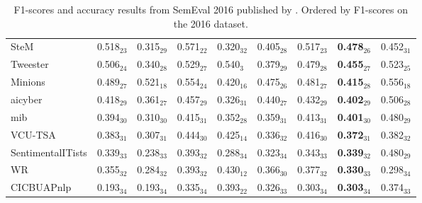 \begin{table}[H]
{\begin{tabular}{|l|ll|lll|l|l|l|}
SteM & 0.518$_{23}$ & 0.315$_{29}$ & 0.571$_{22}$ & 0.320$_{32}$ & 0.405$_{28}$ & 0.517$_{23}$ & \bf 0.478$_{26}$ & 0.452$_{31}$ \\
Tweester & 0.506$_{24}$ & 0.340$_{28}$ & 0.529$_{27}$ & 0.540$_{3}$ & 0.379$_{29}$ & 0.479$_{28}$ & \bf 0.455$_{27}$ & 0.523$_{25}$ \\
Minions & 0.489$_{27}$ & 0.521$_{18}$ & 0.554$_{24}$ & 0.420$_{16}$ & 0.475$_{26}$ & 0.481$_{27}$ & \bf 0.415$_{28}$ & 0.556$_{18}$ \\
aicyber & 0.418$_{29}$ & 0.361$_{27}$ & 0.457$_{29}$ & 0.326$_{31}$ & 0.440$_{27}$ & 0.432$_{29}$ & \bf 0.402$_{29}$ & 0.506$_{28}$ \\
mib & 0.394$_{30}$ & 0.310$_{30}$ & 0.415$_{31}$ & 0.352$_{28}$ & 0.359$_{31}$ & 0.413$_{31}$ & \bf 0.401$_{30}$ & 0.480$_{29}$ \\
VCU-TSA & 0.383$_{31}$ & 0.307$_{31}$ & 0.444$_{30}$ & 0.425$_{14}$ & 0.336$_{32}$ & 0.416$_{30}$ & \bf 0.372$_{31}$ & 0.382$_{32}$ \\
SentimentalITists & 0.339$_{33}$ & 0.238$_{33}$ & 0.393$_{32}$ & 0.288$_{34}$ & 0.323$_{34}$ & 0.343$_{33}$ & \bf 0.339$_{32}$ & 0.480$_{29}$ \\
WR & 0.355$_{32}$ & 0.284$_{32}$ & 0.393$_{32}$ & 0.430$_{12}$ & 0.366$_{30}$ & 0.377$_{32}$ & \bf 0.330$_{33}$ & 0.298$_{34}$ \\
CICBUAPnlp & 0.193$_{34}$ & 0.193$_{34}$ & 0.335$_{34}$ & 0.393$_{22}$ & 0.326$_{33}$ & 0.303$_{34}$ & \bf 0.303$_{34}$ & 0.374$_{33}$ \\
    \hline
    \end{tabular}}
    \caption[F1-scores and accuracy results from SemEval 2016]{F1-scores and accuracy results from SemEval 2016 published by \cite{SemEval:2016:task4}. Ordered by F1-scores on the 2016 dataset.}
    \label{tab:semeval_results}
\end{table}
